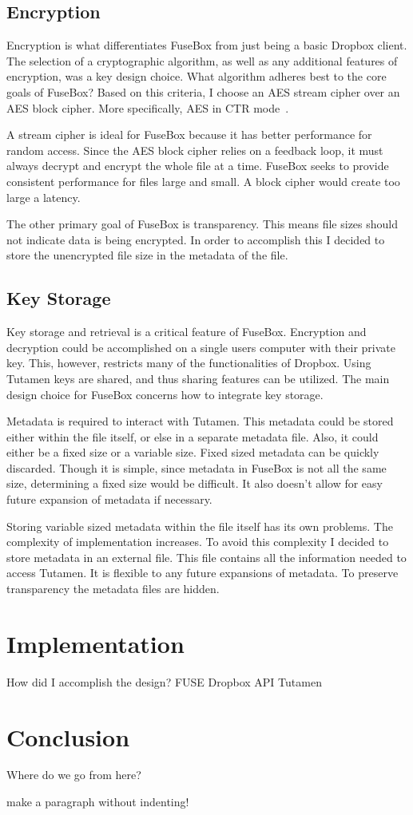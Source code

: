 \documentclass[11pt,twocolumn,letterpaper]{article}
\newcommand{\appname}{FuseBox }
\newcommand{\appnameWOspace}{FuseBox}
\newcommand{\custos}{Tutamen }
\newcommand{\custosWOspace}{Tutamen}
\begin{document}
\subsection{Encryption}
\label{sec:enc}
Encryption is what differentiates \appname from just being a basic
Dropbox client. The selection of a cryptographic algorithm, as well as
any additional features of encryption, was a key design choice. What
algorithm adheres best to the core goals of \appnameWOspace? Based on
this criteria, I choose an AES stream cipher over an AES block
cipher. More specifically, AES in CTR mode~\cite{AESCTR}.  
\par A stream cipher is ideal for \appname because it has better
performance for random access. Since the AES block 
cipher relies on a feedback loop, it must always decrypt and encrypt
the whole file at a time. \appname seeks to provide consistent
performance for files large and small. A block cipher would create
too large a latency.   
\par The other primary goal of \appname is transparency. This means
file sizes should not indicate data is being encrypted. In order to
accomplish this I decided to store the unencrypted file size in the
metadata of the file. 

\subsection{Key Storage}
\label{sec:keystorage}
Key storage and retrieval is a critical feature of \appnameWOspace. 
Encryption and decryption could be accomplished on a single users
computer with their private key. This, however, restricts many of the
functionalities of Dropbox. Using \custos keys are shared, and thus 
sharing features can be utilized. The main design choice for \appname
concerns how to integrate key storage.  
\par Metadata is required to interact with \custosWOspace. This
metadata could be stored either within the file itself, or else in a
separate metadata file. Also, it could either be a fixed size or a
variable size. Fixed sized metadata can be quickly discarded. Though
it is simple, since metadata in \appname is not all the same size,
determining a fixed size would be difficult. It also doesn't allow for
easy future expansion of metadata if necessary. 
\par Storing variable sized metadata within the file itself has its
own problems. The complexity of implementation increases. To avoid
this complexity I decided to store metadata in an external file. This
file contains all the information needed to access \custosWOspace. It
is flexible to any future expansions of metadata. 
To preserve transparency the metadata files are hidden. 

\section{Implementation}
\label{sec:implementation}

How did I accomplish the design?
FUSE
Dropbox API
\custos

\section{Conclusion}
\label{sec:conclusion}

Where do we go from here?

\noindent
make a paragraph without indenting!



\end{document}
